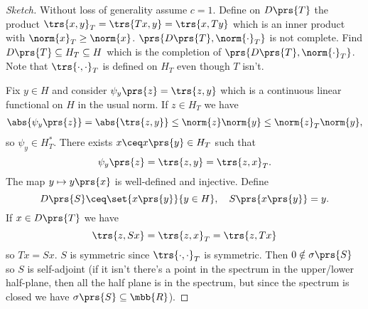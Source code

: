 \documentclass[10pt, twoside]{book}
\begin{document}
\begin{proof}[Sketch]
Without loss of generality assume $c = 1$. Define on $D\prs{T}$ the product $\trs{x,y}_T = \trs{Tx, y} = \trs{x, Ty}$ which is an inner product with $\norm{x}_T \geq \norm{x}$. $\prs{D\prs{T}, \norm{\cdot}_T}$ is not complete. Find $D\prs{T} \subseteq H_T \subseteq H$ which is the completion of $\prs{D\prs{T}, \norm{\cdot}_T}$.
Note that $\trs{\cdot,\cdot}_T$ is defined on $H_T$ even though $T$ isn't.

Fix $y \in H$ and consider $\psi_y\prs{z} = \trs{z,y}$ which is a continuous linear functional on $H$ in the usual norm. If $z \in H_T$ we have
\begin{align*}
\abs{\psi_y\prs{z}} = \abs{\trs{z,y}} \leq \norm{z}\norm{y} \leq \norm{z}_T \norm{y} \text{,}
\end{align*}
so $\psi_y \in H_T^*$. There exists $x \ceq x\prs{y} \in H_T$ such that
\[\psi_y\prs{z} = \trs{z,y} = \trs{z,x}_T \text{.}\]
The map $y \mapsto y\prs{x}$ is well-defined and injective. Define
\[D\prs{S} \ceq \set{x\prs{y}}{y \in H}, \quad S\prs{x\prs{y}} = y \text{.}\]
If $x \in D\prs{T}$ we have
\[\trs{z, Sx} = \trs{z,x}_T = \trs{z,Tx}\]
so $Tx = Sx$.
$S$ is symmetric since $\trs{\cdot,\cdot}_T$ is symmetric. Then $0 \notin \sigma\prs{S}$ so $S$ is self-adjoint (if it isn't there's a point in the spectrum in the upper/lower half-plane, then all the half plane is in the spectrum, but since the spectrum is closed we have $\sigma\prs{S} \subseteq \mbb{R}$).
\end{proof}
\end{document}
